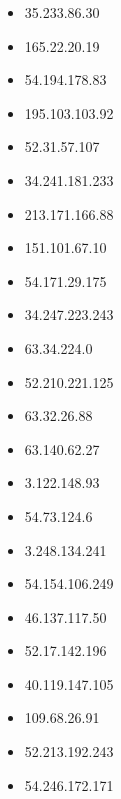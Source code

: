 \documentclass{article}
\begin{document}
\begin{itemize}
        \item 35.233.86.30
    
        \item 165.22.20.19
    
        \item 54.194.178.83
    
        \item 195.103.103.92
    
        \item 52.31.57.107
    
        \item 34.241.181.233
    
        \item 213.171.166.88
    
        \item 151.101.67.10
    
        \item 54.171.29.175
    
        \item 34.247.223.243
    
        \item 63.34.224.0
    
        \item 52.210.221.125
    
        \item 63.32.26.88
    
        \item 63.140.62.27
    
        \item 3.122.148.93
    
        \item 54.73.124.6
    
        \item 3.248.134.241
    
        \item 54.154.106.249
    
        \item 46.137.117.50
    
        \item 52.17.142.196
    
        \item 40.119.147.105
    
        \item 109.68.26.91
    
        \item 52.213.192.243
    
        \item 54.246.172.171
    

\end{itemize}
\end{document}
